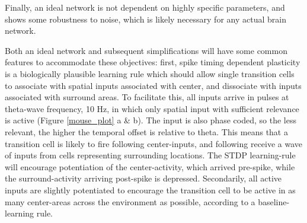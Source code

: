 \documentclass{article}
\begin{document}
    Finally, an ideal network is not dependent on highly specific parameters, and shows some robustness to noise, which is likely necessary for any actual brain network.

    Both an ideal network and subsequent simplifications will have some common features to accommodate these objectives: first, spike timing dependent plasticity is a biologically plausible learning rule which should allow single transition cells to associate with spatial inputs associated with center, and dissociate with inputs associated with surround areas. To facilitate this, all inputs arrive in pulses at theta-wave frequency, 10 Hz, in which only spatial input with sufficient relevance is active (Figure \ref{mouse_plot} a \& b). The input is also phase coded, so the less relevant, the higher the temporal offset is relative to theta. This means that a transition cell is likely to fire following center-inputs, and following receive a wave of inputs from cells representing surrounding locations. The STDP learning-rule will encourage potentiation of the center-activity, which arrived pre-spike, while the surround-activity arriving post-spike is depressed. Secondarily, all active inputs are slightly potentiated to encourage the transition cell to be active in as many center-areas across the environment as possible, according to a baseline-learning rule.
\end{document}

